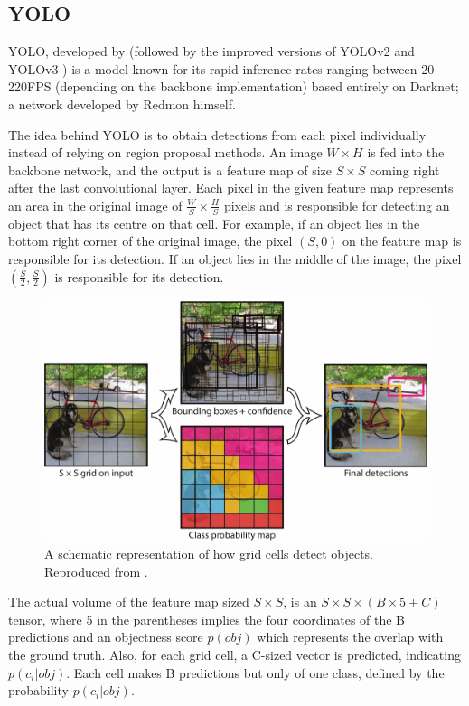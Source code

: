  \subsection{YOLO}
 YOLO, developed by \cite{redmon2016you} (followed by the improved versions of YOLOv2 \cite{redmon2017yolo9000} and YOLOv3 \cite{redmon2018yolov3}) is a model known for its rapid inference 
 rates ranging between 20-220FPS (depending on the backbone implementation) based entirely on Darknet; a network developed by Redmon himself.
 
The idea behind YOLO is to obtain detections from each pixel individually instead of relying on region proposal methods. An image $W\times H$ is fed into the backbone network, and the output is a feature map of size $S\times S$ coming right after the last convolutional layer. Each pixel in the given feature map represents an area in the original image of $\frac{W}{S} \times \frac{H}{S}$ pixels and is responsible for detecting an object that has its centre on that cell. For example, if an object lies in the bottom right corner of the original image, the pixel $(S,0)$ on the feature map is responsible for its detection. If an object lies in the middle of the image, the pixel $(\frac{S}{2},\frac{S}{2})$ is responsible for its detection. 
 
\begin{figure}[!htb]
  \centering
  \includegraphics[width=12cm]{figures/ch2/fig5.png}
  \caption{A schematic representation of how grid cells detect objects. Reproduced from \cite{redmon2016you}.}
  \label{fig5}
\end{figure} 
 
The actual volume of the feature map sized $S\times S$, is an $S\times S \times (B\times5+C)$ tensor, where 5 in the parentheses implies the four coordinates of the B predictions and an objectness score $p(obj)$ which represents the overlap with the ground truth. Also, for each grid cell, a C-sized vector is predicted, indicating $p(c_i|obj)$. Each cell makes B predictions but only of one class, defined by the probability $p(c_i|obj)$. 


